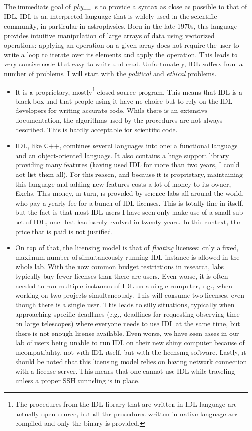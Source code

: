 \documentclass[12pt]{report}
\newcommand{\phypp}{\textit{phy}$_{\text{++}}$\xspace}
\begin{document}
The immediate goal of \phypp is to provide a syntax as close as possible to that of IDL. IDL is an interpreted language that is widely used in the scientific community, in particular in astrophysics. Born in the late 1970s, this language provides intuitive manipulation of large arrays of data using vectorized operations: applying an operation on a given array does not require the user to write a loop to iterate over its elements and apply the operation. This leads to very concise code that easy to write and read. Unfortunately, IDL suffers from a number of problems. I will start with the \emph{political} and \emph{ethical} problems.
\begin{itemize}
\item It is a proprietary, mostly\footnote{The procedures from the IDL library that are written in IDL language are actually open-source, but all the procedures written in native language are compiled and only the binary is provided.} closed-source program. This means that IDL is a black box and that people using it have no choice but to rely on the IDL developers for writing accurate code. While there is an extensive documentation, the algorithms used by the procedures are not always described. This is hardly acceptable for scientific code.
\item IDL, like C++, combines several languages into one: a functional language and an object-oriented language. It also contains a huge support library providing many features (having used IDL for more than two years, I could not list them all). For this reason, and because it is proprietary, maintaining this language and adding new features costs a lot of money to its owner, Exelis. This money, in turn, is provided by science labs all around the world, who pay a yearly fee for a bunch of IDL licenses. This is totally fine in itself, but the fact is that most IDL users I have seen only make use of a small sub-set of IDL, one that has barely evolved in twenty years. In this context, the price that is paid is not justified.
\item On top of that, the licensing model is that of \emph{floating} licenses: only a fixed, maximum number of simultaneously running IDL instance is allowed in the whole lab. With the now common budget restrictions in research, labs typically buy fewer licenses than there are users. Even worse, it is often needed to run multiple instances of IDL on a single computer, e.g., when working on two projects simultaneously. This will consume two licenses, even though there is a single user. This leads to silly situations, typically when approaching specific deadlines (e.g., deadlines for requesting observing time on large telescopes) where everyone needs to use IDL at the same time, but there is not enough license available. Even worse, we have seen cases in our lab of users being unable to run IDL on their new shiny computer because of incompatibility, not with IDL itself, but with the licensing software. Lastly, it should be noted that this licensing model relies on having network connection with a license server. This means that one cannot use IDL while traveling unless a proper SSH tunneling is in place.
\end{itemize}
\end{document}
